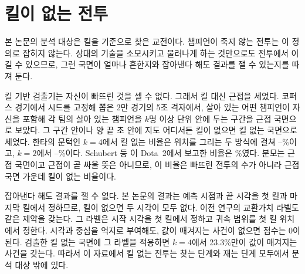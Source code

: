 \section{킬이 없는 전투}
\label{sec:eng-killless}

본 논문의 분석 대상은 킬을 기준으로 찾은 교전이다. 챔피언이 죽지 않는 전투는 이 정의로 잡히지 않는다. 상대의 기술을 소모시키고 물러나게 하는 것만으로도 전투에서 이길 수 있으므로, 그런 국면이 얼마나 흔한지와 잡아낸다 해도 결과를 잴 수 있는지를 따져 둔다.

킬 기반 검출기는 자신이 빠뜨린 것을 셀 수 없다. 그래서 킬 대신 근접을 세었다. 코퍼스 \numMatchesTotal{} 경기에서 시드를 고정해 뽑은 2만 경기의 5초 격자에서, 살아 있는 어떤 챔피언이 자신을 포함해 각 팀의 살아 있는 챔피언을 $k$명 이상 \constR{} 단위 안에 두는 구간을 근접 국면으로 보았다. 그 구간 안이나 양 끝 \constB{}초 안에 지도 어디서든 킬이 없으면 킬 없는 국면으로 세었다. 한타의 문턱인 $k = 4$에서 킬 없는 비율은 위치를 그리는 두 방식에 걸쳐 \killlessFourLo{}--\killlessFourHi{}\%이고, $k = 2$에서 \killlessTwoLo{}--\killlessTwoHi{}\%이다. Schubert 등 \cite{schubert2016encounter}이 Dota~2에서 보고한 비율은 \killlessSchubert{}\%였다. 분모는 근접 국면이고 근접이 곧 싸울 뜻은 아니므로, 이 비율은 빠뜨린 전투의 수가 아니라 근접 국면 가운데 킬이 없는 비율이다.

잡아낸다 해도 결과를 잴 수 없다. 본 논문의 결과는 예측 시점과 끝 시각을 첫 킬과 마지막 킬에서 정하므로, 킬이 없으면 두 시각이 모두 없다. 이전 연구의 교환가치 라벨도 같은 제약을 갖는다. 그 라벨은 시작 시각을 첫 킬에서 정하고 귀속 범위를 첫 킬 위치에서 정한다. 시각과 중심을 억지로 부여해도, 값이 매겨지는 사건이 없으면 점수는 0이 된다. 검출한 킬 없는 국면에 그 라벨을 적용하면 $k = 4$에서 23.3\%만이 값이 매겨지는 사건을 갖는다. 따라서 이 자료에서 킬 없는 전투는 찾는 단계와 재는 단계 모두에서 분석 대상 밖에 있다.

